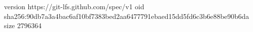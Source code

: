 version https://git-lfs.github.com/spec/v1
oid sha256:90db7a3a4bac6af10bf7383bed2aa6477791ebaed15dd5fd6c3b6e88be90b6da
size 2796364
